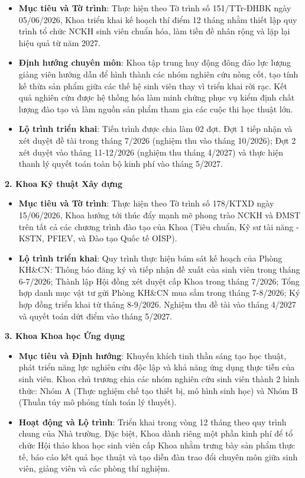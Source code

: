 \documentclass[11pt,a4paper]{article}
\providecommand{\tightlist}{%
  \setlength{\itemsep}{0pt}\setlength{\parskip}{0pt}}
\begin{document}
\begin{itemize}
\tightlist
\item
  \textbf{Mục tiêu và Tờ trình}: Thực hiện theo Tờ trình số 151/TTr-ĐHBK
  ngày 05/06/2026, Khoa triển khai kế hoạch thí điểm 12 tháng nhằm thiết
  lập quy trình tổ chức NCKH sinh viên chuẩn hóa, làm tiền đề nhân rộng
  và lặp lại hiệu quả từ năm 2027.
\item
  \textbf{Định hướng chuyên môn}: Khoa tập trung huy động đông đảo lực
  lượng giảng viên hướng dẫn để hình thành các nhóm nghiên cứu nòng cốt,
  tạo tính kế thừa sản phẩm giữa các thế hệ sinh viên thay vì triển khai
  rời rạc. Kết quả nghiên cứu được hệ thống hóa làm minh chứng phục vụ
  kiểm định chất lượng đào tạo và làm nguồn sản phẩm tham gia các cuộc
  thi học thuật lớn.
\item
  \textbf{Lộ trình triển khai}: Tiến trình được chia làm 02 đợt. Đợt 1
  tiếp nhận và xét duyệt đề tài trong tháng 7/2026 (nghiệm thu vào tháng
  10/2026); Đợt 2 xét duyệt vào tháng 11-12/2026 (nghiệm thu tháng
  4/2027) và thực hiện thanh lý quyết toán toàn bộ kinh phí vào tháng
  5/2027.
\end{itemize}

\textbf{2. Khoa Kỹ thuật Xây dựng}

\begin{itemize}
\tightlist
\item
  \textbf{Mục tiêu và Tờ trình}: Thực hiện theo Tờ trình số 178/KTXD
  ngày 15/06/2026, Khoa hướng tới thúc đẩy mạnh mẽ phong trào NCKH và
  ĐMST trên tất cả các chương trình đào tạo của Khoa (Tiêu chuẩn, Kỹ sư
  tài năng - KSTN, PFIEV, và Đào tạo Quốc tế OISP).
\item
  \textbf{Lộ trình triển khai}: Quy trình thực hiện bám sát kế hoạch của
  Phòng KH\&CN: Thông báo đăng ký và tiếp nhận đề xuất của sinh viên
  trong tháng 6-7/2026; Thành lập Hội đồng xét duyệt cấp Khoa trong
  tháng 7/2026; Tổng hợp danh mục vật tư gửi Phòng KH\&CN mua sắm trong
  tháng 7-8/2026; Ký hợp đồng triển khai từ tháng 8-9/2026. Nghiệm thu
  đề tài vào tháng 4/2027 và quyết toán dứt điểm vào tháng 5/2027.
\end{itemize}

\textbf{3. Khoa Khoa học Ứng dụng}

\begin{itemize}
\tightlist
\item
  \textbf{Mục tiêu và Định hướng}: Khuyến khích tinh thần sáng tạo học
  thuật, phát triển năng lực nghiên cứu độc lập và khả năng ứng dụng
  thực tiễn của sinh viên. Khoa chủ trương chia các nhóm nghiên cứu sinh
  viên thành 2 hình thức: Nhóm A (Thực nghiệm chế tạo thiết bị, mô hình
  sinh học) và Nhóm B (Thuần túy mô phỏng tính toán lý thuyết).
\item
  \textbf{Hoạt động và Lộ trình}: Triển khai trong vòng 12 tháng theo
  quy trình chung của Nhà trường. Đặc biệt, Khoa dành riêng một phần
  kinh phí để tổ chức Hội thảo khoa học sinh viên cấp Khoa nhằm trưng
  bày sản phẩm thực tế, báo cáo kết quả học thuật và tạo diễn đàn trao
  đổi chuyên môn giữa sinh viên, giảng viên và các phòng thí nghiệm.
\end{itemize}
\end{document}
